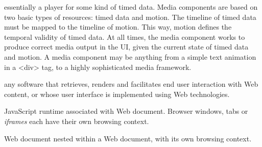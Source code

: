 essentially a player for some kind of timed data. Media components are based
on two basic types of resources: timed data and motion. The timeline of timed
data must be mapped to the timeline of motion. This way, motion defines the
temporal validity of timed data. At all times, the media component works to
produce correct media output in the UI, given the current state of timed data
and motion. A media component may be anything from a simple text animation in
a {\textless}div{\textgreater} tag, to a highly sophisticated media framework.



any software that retrieves, renders and facilitates end user interaction with
Web content, or whose user interface is implemented using Web technologies.


JavaScript runtime associated with Web document. Browser windows, tabs or
\emph{iframes} each have their own browsing context.


Web document nested within a Web document, with its own browsing context.
